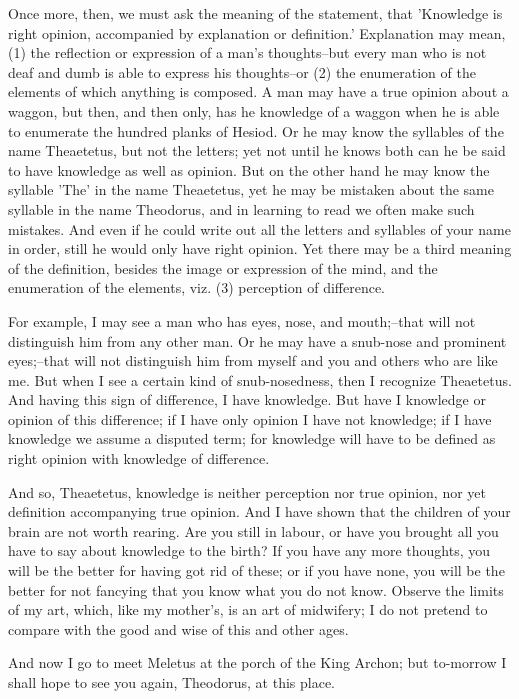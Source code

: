 Once more, then, we must ask the meaning of the statement, that
'Knowledge is right opinion, accompanied by explanation or definition.'
Explanation may mean, (1) the reflection or expression of a man's
thoughts--but every man who is not deaf and dumb is able to express his
thoughts--or (2) the enumeration of the elements of which anything is
composed. A man may have a true opinion about a waggon, but then, and
then only, has he knowledge of a waggon when he is able to enumerate
the hundred planks of Hesiod. Or he may know the syllables of the name
Theaetetus, but not the letters; yet not until he knows both can he be
said to have knowledge as well as opinion. But on the other hand he may
know the syllable 'The' in the name Theaetetus, yet he may be mistaken
about the same syllable in the name Theodorus, and in learning to read
we often make such mistakes. And even if he could write out all the
letters and syllables of your name in order, still he would only have
right opinion. Yet there may be a third meaning of the definition,
besides the image or expression of the mind, and the enumeration of the
elements, viz. (3) perception of difference.

For example, I may see a man who has eyes, nose, and mouth;--that will
not distinguish him from any other man. Or he may have a snub-nose and
prominent eyes;--that will not distinguish him from myself and you and
others who are like me. But when I see a certain kind of snub-nosedness,
then I recognize Theaetetus. And having this sign of difference, I have
knowledge. But have I knowledge or opinion of this difference; if I
have only opinion I have not knowledge; if I have knowledge we assume
a disputed term; for knowledge will have to be defined as right opinion
with knowledge of difference.

And so, Theaetetus, knowledge is neither perception nor true opinion,
nor yet definition accompanying true opinion. And I have shown that the
children of your brain are not worth rearing. Are you still in labour,
or have you brought all you have to say about knowledge to the birth? If
you have any more thoughts, you will be the better for having got rid of
these; or if you have none, you will be the better for not fancying that
you know what you do not know. Observe the limits of my art, which, like
my mother's, is an art of midwifery; I do not pretend to compare with
the good and wise of this and other ages.

And now I go to meet Meletus at the porch of the King Archon; but
to-morrow I shall hope to see you again, Theodorus, at this place.


